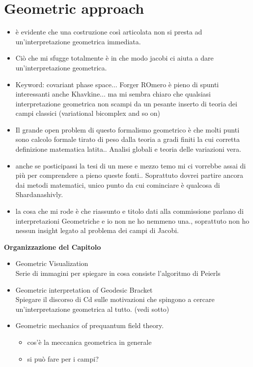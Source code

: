 \documentclass[Main]{subfiles}
\begin{document}
\chapter{Geometric approach}
		\begin{Warning}
		\begin{itemize}
			\item 		è evidente che una costruzione così articolata non si presta ad un'interpretazione geometrica immediata.
			\item 		Ciò che mi sfugge totalmente è in che modo jacobi ci aiuta a dare  un'interpretazione geometrica.
			\item		Keyword: covariant phase space...  Forger ROmero è pieno di spunti interessanti anche Khavkine... ma mi sembra chiaro che qualsiasi interpretazione geometrica non scampi da un pesante inserto di teoria dei campi classici (variational bicomplex and so on)
			\item		Il grande open problem di questo formalismo geometrico è che molti punti sono calcolo formale tirato di peso dalla teoria a gradi finiti la cui corretta definizione matematica latita.. Analisi globali e teoria delle variazioni vera.
			\item anche se posticipassi la tesi di un mese  e mezzo temo mi ci vorrebbe assai di più per comprendere a pieno queste fonti.. Soprattuto dovrei partire ancora dai metodi matematici, unico punto da cui cominciare è qualcosa di Shardanashivly.
			\item la cosa che mi rode è che riassunto e titolo dati alla commissione parlano di interpretazioni Geometriche e io non ne ho nemmeno una., soprattuto non ho nessun insight legato al problema dei campi di Jacobi.
		\end{itemize}
		\end{Warning}
		\textbf{Organizzazione del Capitolo}
		\begin{itemize}
			\item Geometric Visualization\\
				Serie di immagini per spiegare in cosa consiste l'algoritmo di Peierls
			\item Geometric interpretation of Geodesic Bracket \\
				Spiegare il discorso di Cd sulle motivazioni che spingono a cercare un'interpretazione geometrica al tutto. (vedi sotto)
			\item Geometric mechanics of prequantum field theory.
				\begin{itemize}
					\item cos'è la meccanica geometrica in generale
					\item si può fare per i campi?
				\end{itemize}
		\end{itemize}
		
\end{document}
